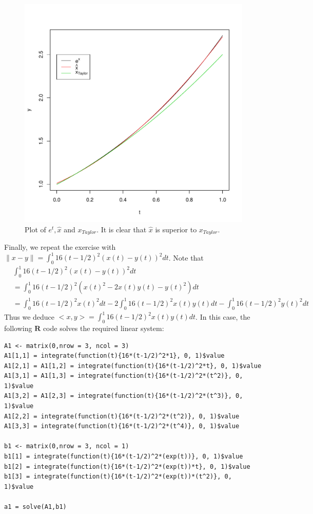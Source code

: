 \documentclass[12pt, leqno]{article}
\providecommand{\norm}[1]{\lVert#1\rVert} %
\begin{document}
\begin{figure}[H]
\begin{center}
  \includegraphics[scale=0.4]{hw1p1.pdf}
\end{center}
\caption{Plot of  $e^t, \hat{x}$ and $x_{Taylor}$. It is clear that  $\hat{x}$ is superior to $x_{Taylor}$.} 
\label{fig:hw1p1}
\end{figure}

Finally, we repeat the exercise with $\norm{x-y} = \int_0^1 16(t-1/2)^2(x(t)-y(t))^2 dt$. Note that
\begin{align*}
&\int_0^1 16(t-1/2)^2(x(t)-y(t))^2 dt \\
&= \int_0^1 16(t-1/2)^2(x(t)^2-2x(t)y(t)-y(t)^2) dt \\
&= \int_0^1 16(t-1/2)^2 x(t)^2 dt -2 \int_0^1 16(t-1/2)^2 x(t)y(t) dt- \int_0^1 16(t-1/2)^2 y(t)^2 dt
\end{align*}
Thus we deduce $<x,y> = \int_0^1 16(t-1/2)^2 x(t)y(t) dt$. In this case, the following $\mathbf{R}$ code solves the required linear system:
\begin{verbatim}
A1 <- matrix(0,nrow = 3, ncol = 3)
A1[1,1] = integrate(function(t){16*(t-1/2)^2*1}, 0, 1)$value
A1[2,1] = A1[1,2] = integrate(function(t){16*(t-1/2)^2*t}, 0, 1)$value
A1[3,1] = A1[1,3] = integrate(function(t){16*(t-1/2)^2*(t^2)}, 0, 1)$value
A1[3,2] = A1[2,3] = integrate(function(t){16*(t-1/2)^2*(t^3)}, 0, 1)$value
A1[2,2] = integrate(function(t){16*(t-1/2)^2*(t^2)}, 0, 1)$value
A1[3,3] = integrate(function(t){16*(t-1/2)^2*(t^4)}, 0, 1)$value

b1 <- matrix(0,nrow = 3, ncol = 1)
b1[1] = integrate(function(t){16*(t-1/2)^2*(exp(t))}, 0, 1)$value
b1[2] = integrate(function(t){16*(t-1/2)^2*(exp(t))*t}, 0, 1)$value
b1[3] = integrate(function(t){16*(t-1/2)^2*(exp(t))*(t^2)}, 0, 1)$value

a1 = solve(A1,b1)
\end{verbatim}
\end{document}
